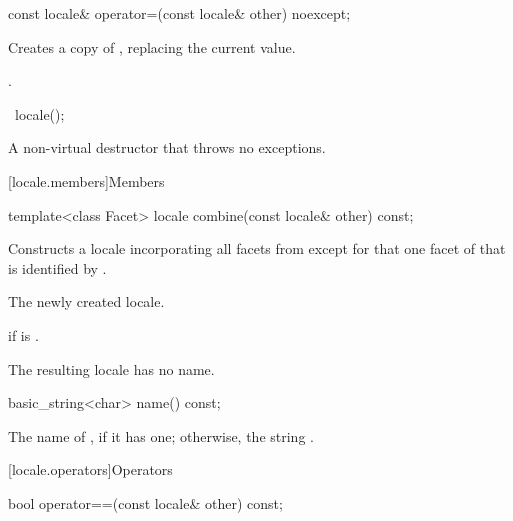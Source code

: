 %
\begin{itemdecl}
const locale& operator=(const locale& other) noexcept;
\end{itemdecl}

\begin{itemdescr}
\pnum
\effects
Creates a copy of , replacing the current value.

\pnum
\returns
{}.
\end{itemdescr}

%
\begin{itemdecl}
~locale();
\end{itemdecl}

\begin{itemdescr}
\pnum
A non-virtual destructor that throws no exceptions.
\end{itemdescr}

[locale.members]{Members}

%
\begin{itemdecl}
template<class Facet> locale combine(const locale& other) const;
\end{itemdecl}

\begin{itemdescr}
\pnum
\effects
Constructs a locale incorporating
all facets from
except for that one facet of
that is identified by
.

\pnum
\returns
The newly created locale.

\pnum
\throws
{}
if
is .

\pnum
\remarks
The resulting locale has no name.
\end{itemdescr}

%
\begin{itemdecl}
basic_string<char> name() const;
\end{itemdecl}

\begin{itemdescr}
\pnum
\returns
The name of
,
if it has one; otherwise, the string .
\end{itemdescr}

[locale.operators]{Operators}

%
\begin{itemdecl}
bool operator==(const locale& other) const;
\end{itemdecl}

